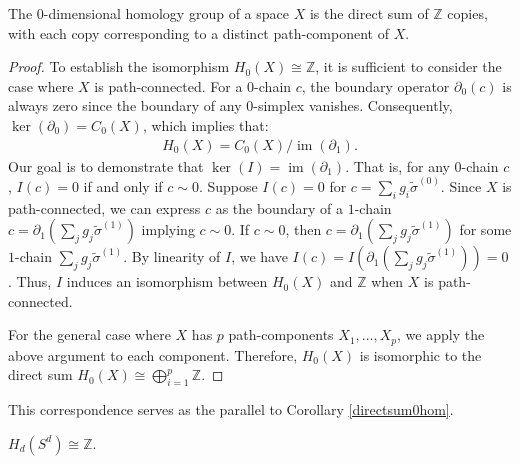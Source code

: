 \begin{proposition}
	The \( 0 \)-dimensional homology group of a space \( X \) is the direct sum of \(\mathbb{Z}\) copies, with each copy corresponding to a distinct path-component of \( X \).
\end{proposition}

\begin{proof}
	To establish the isomorphism \( H_{0}(X) \cong \mathbb{Z} \), it is sufficient to consider the case where \( X \) is path-connected. For a \( 0 \)-chain \( c \), the boundary operator \( \partial_{0}(c) \) is always zero since the boundary of any \( 0 \)-simplex vanishes. Consequently, \( \ker(\partial_{0}) = C_{0}(X) \), which implies that:
	\begin{align}
		H_{0}(X) = C_{0}(X) / \operatorname{im}(\partial_{1}). 
	\end{align}
	Our goal is to demonstrate that \( \ker(I) = \operatorname{im}(\partial_{1}) \). That is, for any \( 0 \)-chain \( c \), \( I(c) = 0 \) if and only if \( c \sim 0 \). Suppose \( I(c) = 0 \) for \( c = \sum_{i} g_{i} \tilde{\sigma}^{(0)} \). Since \( X \) is path-connected, we can express \( c \) as the boundary of a \( 1 \)-chain $c = \partial_{1} ( \sum_{j} g_{j} \tilde{\sigma}^{(1)})$ implying $c \sim 0$. If \( c \sim 0 \), then \( c = \partial_{1} ( \sum_{j} g_{j} \tilde{\sigma}^{(1)}) \) for some \( 1 \)-chain \( \sum_{j} g_{j} \tilde{\sigma}^{(1)} \). By linearity of \( I \), we have	$I(c) = I( \partial_{1} ( \sum_{j} g_{j} \tilde{\sigma}^{(1)} )) = 0$. Thus, \( I \) induces an isomorphism between \( H_{0}(X) \) and \( \mathbb{Z} \) when \( X \) is path-connected.
	
	For the general case where \( X \) has \( p \) path-components \( X_{1}, \ldots, X_{p} \), we apply the above argument to each component. Therefore, \( H_{0}(X) \) is isomorphic to the direct sum $H_{0}(X) \cong \bigoplus_{i=1}^{p} \mathbb{Z}$.
\end{proof}

This correspondence serves as the parallel to Corollary \ref{directsum0hom}.

\begin{proposition}
	\( H_{d}(S^{d}) \cong \mathbb{Z} \).
	\end{proposition}

